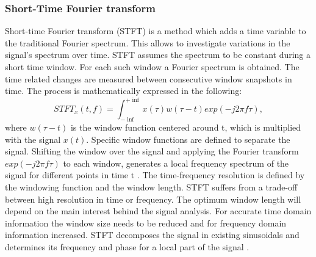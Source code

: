 \subsubsection{Short-Time Fourier transform}
Short-time Fourier transform (STFT) is a method which adds a time variable to the traditional Fourier spectrum. This allows to investigate variations in the signal's spectrum over time. STFT assumes the spectrum to be constant during a short time window. For each such window a Fourier spectrum is obtained. The time related changes are measured between consecutive window snapshots in time. The process is mathematically expressed in the following:  
\begin{equation}
    STFT_{x}(t,f) = \int_{- \inf}^{+ \inf}x(\tau) w(\tau -t) exp(-j2\pi f \tau),
\end{equation}
where  $w(\tau -t)$ is the window function centered around t, which is multiplied with the signal $x(t)$. Specific window functions are defined to separate the signal. Shifting the window over the signal and applying the Fourier transform $exp(-j2\pi f \tau)$ to each window, generates a local frequency spectrum of the signal for different points in time t \cite{FENG2013}. The time-frequency resolution is defined by the windowing function and the window length. STFT suffers from a trade-off between high resolution in time or frequency. The optimum window length will depend on the main interest behind the signal analysis. For accurate time domain information the window size needs to be reduced and for frequency domain information increased. STFT  decomposes the signal in existing sinusoidals and determines its frequency and phase for a local part of the signal \cite{Hlawatsch1992}. 

